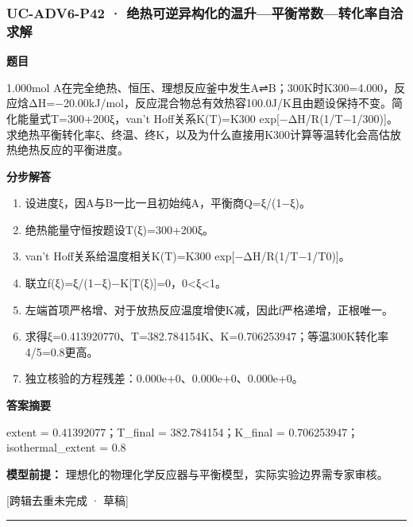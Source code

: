 \documentclass[UTF8,11pt,a4paper]{ctexart}
\begin{document}
\subsubsection*{UC-ADV6-P42 · 绝热可逆异构化的温升—平衡常数—转化率自洽求解}
\noindent\textbf{题目}\par
1.000mol A在完全绝热、恒压、理想反应釜中发生A⇌B；300K时K300=4.000，反应焓ΔH=−20.00kJ/mol，反应混合物总有效热容100.0J/K且由题设保持不变。简化能量式T=300+200ξ，van't Hoff关系K(T)=K300 exp[−ΔH/R(1/T−1/300)]。求绝热平衡转化率ξ、终温、终K，以及为什么直接用K300计算等温转化会高估放热绝热反应的平衡进度。\par
\medskip\noindent\textbf{分步解答}
\begin{enumerate}
\item 设进度ξ，因A与B一比一且初始纯A，平衡商Q=ξ/(1−ξ)。
\item 绝热能量守恒按题设T(ξ)=300+200ξ。
\item van't Hoff关系给温度相关K(T)=K300 exp[−ΔH/R(1/T−1/T0)]。
\item 联立f(ξ)=ξ/(1−ξ)−K[T(ξ)]=0，0<ξ<1。
\item 左端首项严格增、对于放热反应温度增使K减，因此f严格递增，正根唯一。
\item 求得ξ=0.413920770、T=382.784154K、K=0.706253947；等温300K转化率4/5=0.8更高。
\item 独立核验的方程残差：0.000e+0、0.000e+0、0.000e+0。
\end{enumerate}
\noindent\textbf{答案摘要}\par
extent = 0.41392077；T\_final = 382.784154；K\_final = 0.706253947；isothermal\_extent = 0.8\par
\noindent\textbf{模型前提：}
理想化的物理化学反应器与平衡模型，实际实验边界需专家审核。\par
\noindent\textcolor{red!65!black}{[跨辑去重未完成 · 草稿]} \par
\medskip\hrule\medskip
\end{document}
